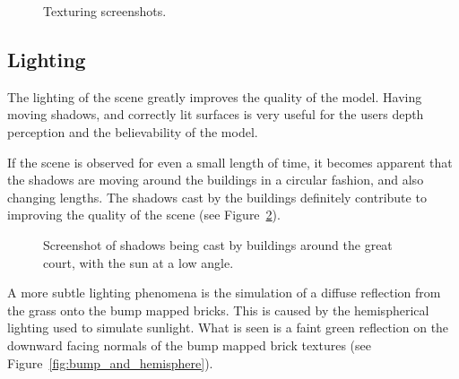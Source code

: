         \begin{figure}[H]
            \centering{}
            \caption{Texturing screenshots.}
            \label{fig:texture_examples}
        \end{figure}        

    \subsection{Lighting} %
    \label{sub:lighting}
        The lighting of the scene greatly improves the quality of the model.
        Having moving shadows, and correctly lit surfaces is very useful for the users depth perception and the believability of the model.

        If the scene is observed for even a small length of time, it becomes apparent that the shadows are moving around the buildings in a circular fashion, and also changing lengths.
        The shadows cast by the buildings definitely contribute to improving the quality of the scene (see Figure~\ref{fig:shadows}).

        \begin{figure}[H]
            \centering
            \caption{
                Screenshot of shadows being cast by buildings around the great court, with the sun at a low angle.
            }
            \label{fig:shadows}
        \end{figure}

        A more subtle lighting phenomena is the simulation of a diffuse reflection from the grass onto the bump mapped bricks.
        This is caused by the hemispherical lighting used to simulate sunlight.
        What is seen is a faint green reflection on the downward facing normals of the bump mapped brick textures (see Figure~\ref{fig:bump_and_hemisphere}).

